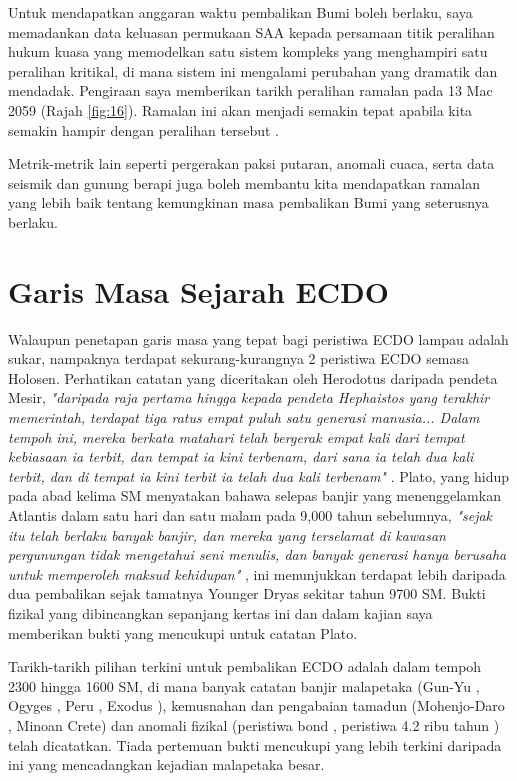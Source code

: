\documentclass[10pt,twocolumn,letterpaper]{article}
\begin{document}
Untuk mendapatkan anggaran waktu pembalikan Bumi boleh berlaku, saya memadankan data keluasan permukaan SAA kepada persamaan titik peralihan hukum kuasa yang memodelkan satu sistem kompleks yang menghampiri satu peralihan kritikal, di mana sistem ini mengalami perubahan yang dramatik dan mendadak. Pengiraan saya memberikan tarikh peralihan ramalan pada 13 Mac 2059 (Rajah \ref{fig:16}). Ramalan ini akan menjadi semakin tepat apabila kita semakin hampir dengan peralihan tersebut \cite{136}.

Metrik-metrik lain seperti pergerakan paksi putaran, anomali cuaca, serta data seismik dan gunung berapi juga boleh membantu kita mendapatkan ramalan yang lebih baik tentang kemungkinan masa pembalikan Bumi yang seterusnya berlaku.

\section{Garis Masa Sejarah ECDO}
Walaupun penetapan garis masa yang tepat bagi peristiwa ECDO lampau adalah sukar, nampaknya terdapat sekurang-kurangnya 2 peristiwa ECDO semasa Holosen. Perhatikan catatan yang diceritakan oleh Herodotus daripada pendeta Mesir, \textit{"daripada raja pertama hingga kepada pendeta Hephaistos yang terakhir memerintah, terdapat tiga ratus empat puluh satu generasi manusia... Dalam tempoh ini, mereka berkata matahari telah bergerak empat kali dari tempat kebiasaan ia terbit, dan tempat ia kini terbenam, dari sana ia telah dua kali terbit, dan di tempat ia kini terbit ia telah dua kali terbenam"} \cite{32}. Plato, yang hidup pada abad kelima SM \cite{111} menyatakan bahawa selepas banjir yang menenggelamkan Atlantis dalam satu hari dan satu malam pada 9,000 tahun sebelumnya, \textit{"sejak itu telah berlaku banyak banjir, dan mereka yang terselamat di kawasan pergunungan tidak mengetahui seni menulis, dan banyak generasi hanya berusaha untuk memperoleh maksud kehidupan"} \cite{112}, ini menunjukkan terdapat lebih daripada dua pembalikan sejak tamatnya Younger Dryas sekitar tahun 9700 SM. Bukti fizikal yang dibincangkan sepanjang kertas ini dan dalam kajian saya \cite{2} memberikan bukti yang mencukupi untuk catatan Plato.

Tarikh-tarikh pilihan terkini untuk pembalikan ECDO adalah dalam tempoh 2300 hingga 1600 SM, di mana banyak catatan banjir malapetaka (Gun-Yu \cite{113,114,115}, Ogyges \cite{116,117}, Peru \cite{118,119}, Exodus \cite{120}), kemusnahan dan pengabaian tamadun (Mohenjo-Daro \cite{121}, Minoan Crete\cite{100,101}) dan anomali fizikal (peristiwa bond \cite{122}, peristiwa 4.2 ribu tahun \cite{90}) telah dicatatkan. Tiada pertemuan bukti mencukupi yang lebih terkini daripada ini yang mencadangkan kejadian malapetaka besar.
\end{document}
